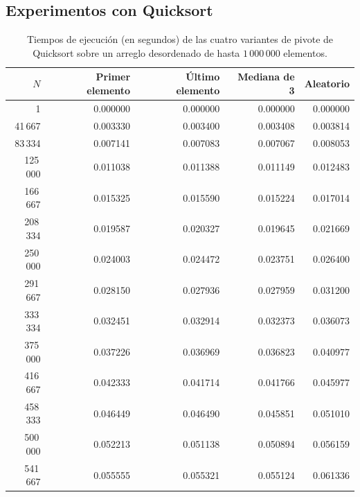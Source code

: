 \subsection{Experimentos con Quicksort}
\begin{table}[!h]
    \centering
    \footnotesize
    \caption{Tiempos de ejecución (en segundos) de las cuatro variantes de pivote de Quicksort sobre un arreglo desordenado de hasta $1\,000\,000$ elementos.}
    \label{tab:quicksort_shuffled}
    \begin{tabular}{r|rrrr}
        \hline
        $N$         & Primer elemento & Último elemento & Mediana de 3 & Aleatorio \\
        \hline
        1           & 0.000000        & 0.000000        & 0.000000     & 0.000000  \\
        41\,667     & 0.003330        & 0.003400        & 0.003408     & 0.003814  \\
        83\,334     & 0.007141        & 0.007083        & 0.007067     & 0.008053  \\
        125\,000    & 0.011038        & 0.011388        & 0.011149     & 0.012483  \\
        166\,667    & 0.015325        & 0.015590        & 0.015224     & 0.017014  \\
        208\,334    & 0.019587        & 0.020327        & 0.019645     & 0.021669  \\
        250\,000    & 0.024003        & 0.024472        & 0.023751     & 0.026400  \\
        291\,667    & 0.028150        & 0.027936        & 0.027959     & 0.031200  \\
        333\,334    & 0.032451        & 0.032914        & 0.032373     & 0.036073  \\
        375\,000    & 0.037226        & 0.036969        & 0.036823     & 0.040977  \\
        416\,667    & 0.042333        & 0.041714        & 0.041766     & 0.045977  \\
        458\,333    & 0.046449        & 0.046490        & 0.045851     & 0.051010  \\
        500\,000    & 0.052213        & 0.051138        & 0.050894     & 0.056159  \\
        541\,667    & 0.055555        & 0.055321        & 0.055124     & 0.061336  \\

\end{tabular}
\end{table}
